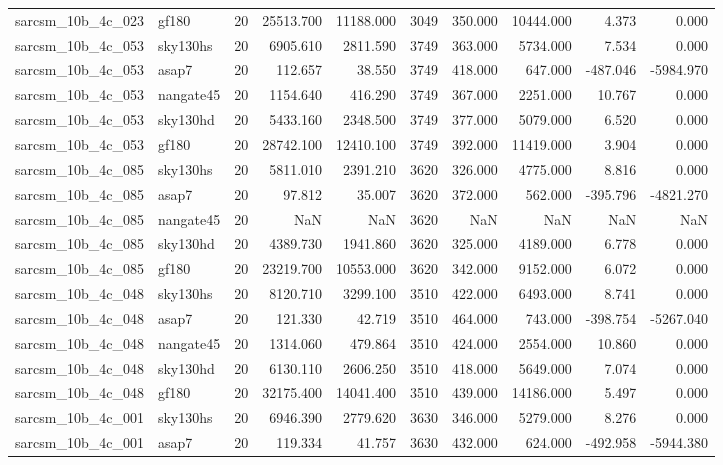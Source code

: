 \begin{longtable}{llrrrrrrrr}
sarcsm\_10b\_4c\_023 & gf180 & 20 & 25513.700 & 11188.000 & 3049 & 350.000 & 10444.000 & 4.373 & 0.000 \\
sarcsm\_10b\_4c\_053 & sky130hs & 20 & 6905.610 & 2811.590 & 3749 & 363.000 & 5734.000 & 7.534 & 0.000 \\
sarcsm\_10b\_4c\_053 & asap7 & 20 & 112.657 & 38.550 & 3749 & 418.000 & 647.000 & -487.046 & -5984.970 \\
sarcsm\_10b\_4c\_053 & nangate45 & 20 & 1154.640 & 416.290 & 3749 & 367.000 & 2251.000 & 10.767 & 0.000 \\
sarcsm\_10b\_4c\_053 & sky130hd & 20 & 5433.160 & 2348.500 & 3749 & 377.000 & 5079.000 & 6.520 & 0.000 \\
sarcsm\_10b\_4c\_053 & gf180 & 20 & 28742.100 & 12410.100 & 3749 & 392.000 & 11419.000 & 3.904 & 0.000 \\
sarcsm\_10b\_4c\_085 & sky130hs & 20 & 5811.010 & 2391.210 & 3620 & 326.000 & 4775.000 & 8.816 & 0.000 \\
sarcsm\_10b\_4c\_085 & asap7 & 20 & 97.812 & 35.007 & 3620 & 372.000 & 562.000 & -395.796 & -4821.270 \\
sarcsm\_10b\_4c\_085 & nangate45 & 20 & NaN & NaN & 3620 & NaN & NaN & NaN & NaN \\
sarcsm\_10b\_4c\_085 & sky130hd & 20 & 4389.730 & 1941.860 & 3620 & 325.000 & 4189.000 & 6.778 & 0.000 \\
sarcsm\_10b\_4c\_085 & gf180 & 20 & 23219.700 & 10553.000 & 3620 & 342.000 & 9152.000 & 6.072 & 0.000 \\
sarcsm\_10b\_4c\_048 & sky130hs & 20 & 8120.710 & 3299.100 & 3510 & 422.000 & 6493.000 & 8.741 & 0.000 \\
sarcsm\_10b\_4c\_048 & asap7 & 20 & 121.330 & 42.719 & 3510 & 464.000 & 743.000 & -398.754 & -5267.040 \\
sarcsm\_10b\_4c\_048 & nangate45 & 20 & 1314.060 & 479.864 & 3510 & 424.000 & 2554.000 & 10.860 & 0.000 \\
sarcsm\_10b\_4c\_048 & sky130hd & 20 & 6130.110 & 2606.250 & 3510 & 418.000 & 5649.000 & 7.074 & 0.000 \\
sarcsm\_10b\_4c\_048 & gf180 & 20 & 32175.400 & 14041.400 & 3510 & 439.000 & 14186.000 & 5.497 & 0.000 \\
sarcsm\_10b\_4c\_001 & sky130hs & 20 & 6946.390 & 2779.620 & 3630 & 346.000 & 5279.000 & 8.276 & 0.000 \\
sarcsm\_10b\_4c\_001 & asap7 & 20 & 119.334 & 41.757 & 3630 & 432.000 & 624.000 & -492.958 & -5944.380 \\

\end{longtable}
